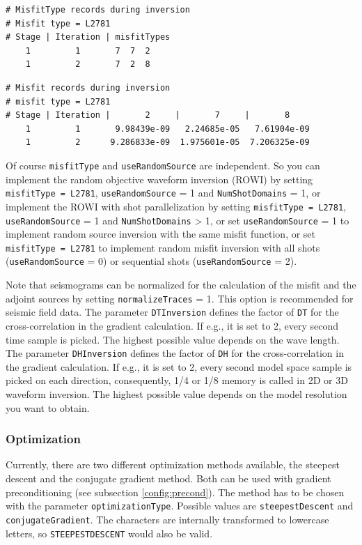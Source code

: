 \documentclass[pdftex,a4paper,parskip,listof=totoc,bibliography=totoc,onehalfspacing,12pt]{scrreprt}
\begin{document}
\begin{verbatim}
# MisfitType records during inversion
# Misfit type = L2781
# Stage | Iteration | misfitTypes
    1         1       7  7  2
    1         2       7  2  8
\end{verbatim}
\begin{verbatim}
# Misfit records during inversion
# misfit type = L2781
# Stage | Iteration |       2     |       7     |       8      
    1         1       9.98439e-09   2.24685e-05   7.61904e-09
    1         2      9.286833e-09  1.975601e-05  7.206325e-09
\end{verbatim}
Of course \verb+misfitType+ and \verb+useRandomSource+ are independent. So you can implement the random objective waveform inversion (ROWI) \citep{pan2020random} by setting \verb+misfitType = L2781+, \verb+useRandomSource+ = 1 and \verb+NumShotDomains+ = 1, or implement the ROWI with shot parallelization by setting \verb+misfitType = L2781+, \verb+useRandomSource+ = 1 and \verb+NumShotDomains+ > 1, or set \verb+useRandomSource+ = 1 to implement random source inversion with the same misfit function, or set \verb+misfitType = L2781+ to implement random misfit inversion with all shots (\verb+useRandomSource+ = 0) or sequential shots (\verb+useRandomSource+ = 2).

Note that seismograms can be normalized for the calculation of the misfit and the adjoint sources by setting \verb+normalizeTraces+ = 1. This option is recommended for seismic field data.
The parameter \verb+DTInversion+ defines the factor of \verb+DT+ for the cross-correlation in the gradient calculation. If e.g., it is set to 2, every second time sample is picked. The highest possible value depends on the wave length.
The parameter \verb+DHInversion+ defines the factor of \verb+DH+ for the cross-correlation in the gradient calculation. If e.g., it is set to 2, every second model space sample is picked on each direction, consequently, 1/4 or 1/8 memory is called in 2D or 3D waveform inversion. The highest possible value depends on the model resolution you want to obtain.

\subsubsection{Optimization}
Currently, there are two different optimization methods available, the steepest descent and the conjugate gradient method. Both can be used with gradient preconditioning (see subsection \ref{config:precond}). The method has to be chosen with the parameter \verb+optimizationType+. Possible values are \verb+steepestDescent+ and \verb+conjugateGradient+. The characters are internally transformed to lowercase letters, so \verb+STEEPESTDESCENT+ would also be valid.
\end{document}
